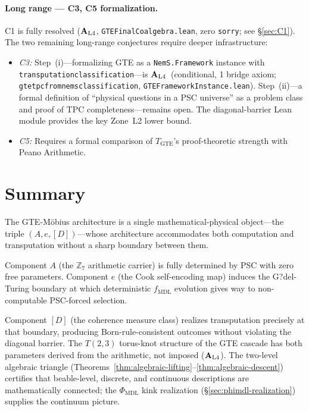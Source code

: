 \documentclass[12pt,letterpaper]{article}
\newcommand{\fmdl}{f_{\mathrm{MDL}}}
\newcommand{\Zseven}{\mathbb{Z}_7}
\newcommand{\Dclass}{[D]}
\newcommand{\TGTE}{T_{\mathrm{GTE}}}
\newcommand{\catAL}{\ensuremath{\textbf{A}_{\rm L4}}}
\newcommand{\lean}[1]{%
  \penalty-100
  \begingroup\def\_{\textunderscore\allowbreak}\texttt{#1}\endgroup}
\begin{document}
\paragraph{Long range --- C3, C5 formalization.}
C1 is fully resolved (\catAL, \lean{GTEFinalCoalgebra\allowbreak.lean},
zero \texttt{sorry}; see \S\ref{sec:C1}).  The two remaining
long-range conjectures require deeper infrastructure:
\begin{itemize}[nosep]
  \item \emph{C3:} Step~(i)---formalizing GTE as a \lean{NemS.Framework} instance
        with \lean{transputation\_classification}---is \catAL\ (conditional,
        1 bridge axiom; \lean{gte\_tpc\_from\_nems\_classification},
        \lean{GTEFrameworkInstance.lean}).
        Step~(ii)---a formal definition of ``physical questions in a PSC universe''
        as a problem class and proof of TPC completeness---remains open.
        The diagonal-barrier Lean module provides the key Zone~L2 lower bound.
  \item \emph{C5:} Requires a formal comparison of $\TGTE$'s proof-theoretic
        strength with Peano Arithmetic.
\end{itemize}

\section{Summary}
\label{sec:summary}

The GTE-M\"{o}bius architecture is a single mathematical-physical object---the triple
$(A, e, \Dclass)$---whose architecture accommodates both computation and
transputation without a sharp boundary between them.

Component $A$ (the $\Zseven$ arithmetic carrier) is fully determined by PSC with zero
free parameters.  Component $e$ (the Cook self-encoding map) induces the
G?del-Turing boundary at which deterministic $\fmdl$ evolution gives way to
non-computable PSC-forced selection.

Component $\Dclass$ (the coherence measure class) realizes transputation precisely at
that boundary, producing Born-rule-consistent outcomes without violating the diagonal
barrier.  The $T(2,3)$ torus-knot structure of the GTE cascade has both parameters
derived from the arithmetic, not imposed (\catAL).
The two-level algebraic triangle
(Theorems~\ref{thm:algebraic-lifting}--\ref{thm:algebraic-descent}) certifies that
beable-level, discrete, and continuous descriptions are mathematically connected;
the $\Phi_{\mathrm{MDL}}$ kink realization (\S\ref{sec:phimdl-realization}) supplies
the continuum picture.
\end{document}
